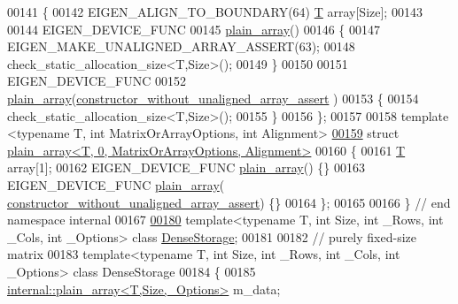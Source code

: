 \begin{DoxyCode}
00141 \{
00142   EIGEN\_ALIGN\_TO\_BOUNDARY(64) \hyperlink{group___sparse_core___module}{T} array[Size];
00143 
00144   EIGEN\_DEVICE\_FUNC
00145   \hyperlink{struct_eigen_1_1internal_1_1plain__array}{plain\_array}() 
00146   \{ 
00147     EIGEN\_MAKE\_UNALIGNED\_ARRAY\_ASSERT(63);
00148     check\_static\_allocation\_size<T,Size>();
00149   \}
00150 
00151   EIGEN\_DEVICE\_FUNC
00152   \hyperlink{struct_eigen_1_1internal_1_1plain__array}{plain\_array}(\hyperlink{struct_eigen_1_1internal_1_1constructor__without__unaligned__array__assert}{constructor\_without\_unaligned\_array\_assert}
      ) 
00153   \{ 
00154     check\_static\_allocation\_size<T,Size>();
00155   \}
00156 \};
00157 
00158 \textcolor{keyword}{template} <\textcolor{keyword}{typename} T, \textcolor{keywordtype}{int} MatrixOrArrayOptions, \textcolor{keywordtype}{int} Alignment>
\hyperlink{struct_eigen_1_1internal_1_1plain__array_3_01_t_00_010_00_01_matrix_or_array_options_00_01_alignment_01_4}{00159} \textcolor{keyword}{struct }\hyperlink{struct_eigen_1_1internal_1_1plain__array_3_01_t_00_010_00_01_matrix_or_array_options_00_01_alignment_01_4}{plain\_array<T, 0, MatrixOrArrayOptions, Alignment>}
00160 \{
00161   \hyperlink{group___sparse_core___module}{T} array[1];
00162   EIGEN\_DEVICE\_FUNC \hyperlink{struct_eigen_1_1internal_1_1plain__array}{plain\_array}() \{\}
00163   EIGEN\_DEVICE\_FUNC \hyperlink{struct_eigen_1_1internal_1_1plain__array}{plain\_array}(
      \hyperlink{struct_eigen_1_1internal_1_1constructor__without__unaligned__array__assert}{constructor\_without\_unaligned\_array\_assert}) \{\}
00164 \};
00165 
00166 \} \textcolor{comment}{// end namespace internal}
00167 
\hyperlink{class_eigen_1_1_dense_storage}{00180} \textcolor{keyword}{template}<\textcolor{keyword}{typename} T, \textcolor{keywordtype}{int} Size, \textcolor{keywordtype}{int} \_Rows, \textcolor{keywordtype}{int} \_Cols, \textcolor{keywordtype}{int} \_Options> \textcolor{keyword}{class }
      \hyperlink{class_eigen_1_1_dense_storage}{DenseStorage};
00181 
00182 \textcolor{comment}{// purely fixed-size matrix}
00183 \textcolor{keyword}{template}<\textcolor{keyword}{typename} T, \textcolor{keywordtype}{int} Size, \textcolor{keywordtype}{int} \_Rows, \textcolor{keywordtype}{int} \_Cols, \textcolor{keywordtype}{int} \_Options> \textcolor{keyword}{class }DenseStorage
00184 \{
00185     \hyperlink{struct_eigen_1_1internal_1_1plain__array}{internal::plain\_array<T,Size,\_Options>} m\_data;

\end{DoxyCode}
